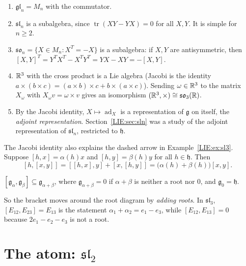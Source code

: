 \begin{example}\leavevmode
\begin{enumerate}[nosep]
\item $\mathfrak{gl}_n=M_n$ with the commutator.
\item $\mathfrak{sl}_n$ is a subalgebra, since $\operatorname{tr}(XY-YX)=0$ for all $X,Y$. It is simple for
  $n\ge2$.
\item $\mathfrak{so}_n=\{X\in M_n: X^T=-X\}$ is a subalgebra: if $X,Y$ are antisymmetric, then
  $[X,Y]^T=Y^TX^T-X^TY^T=YX-XY=-[X,Y]$.
\item $\mathbb{R}^3$ with the cross product is a Lie algebra (Jacobi is the identity
  $a\times(b\times c)=(a\times b)\times c+b\times(a\times c)$). Sending $\omega\in\mathbb{R}^3$ to the matrix
  $X_\omega$ with $X_\omega v=\omega\times v$ gives an isomorphism $(\mathbb{R}^3,\times)\cong\mathfrak{so}_3(\mathbb{R})$.
\item By the Jacobi identity, $X\mapsto\operatorname{ad}_X$ is a representation of $\mathfrak g$ on itself,
  the \emph{adjoint representation}. Section~\ref{LIE:sec:sln} was a study of the adjoint
  representation of $\mathfrak{sl}_n$, restricted to $\mathfrak h$.
\end{enumerate}
\end{example}

The Jacobi identity also explains the dashed arrow in Example~\ref{LIE:ex:sl3}. Suppose
$[h,x]=\alpha(h)x$ and $[h,y]=\beta(h)y$ for all $h\in\mathfrak h$. Then
\[
  [h,[x,y]]=[[h,x],y]+[x,[h,y]]=\big(\alpha(h)+\beta(h)\big)[x,y].
\]

\begin{lemma}\label{LIE:lem:add}
$[\mathfrak g_\alpha,\mathfrak g_\beta]\subseteq\mathfrak g_{\alpha+\beta}$, where
$\mathfrak g_{\alpha+\beta}=0$ if $\alpha+\beta$ is neither a root nor $0$, and $\mathfrak g_0=\mathfrak h$.
\end{lemma}

So the bracket moves around the root diagram by \emph{adding roots}. In $\mathfrak{sl}_3$,
$[E_{12},E_{23}]=E_{13}$ is the statement $\alpha_1+\alpha_2=e_1-e_3$, while $[E_{12},E_{13}]=0$
because $2e_1-e_2-e_3$ is not a root.

\section{The atom: \texorpdfstring{$\mathfrak{sl}_2$}{sl(2)}}
\label{LIE:sec:sl2}


